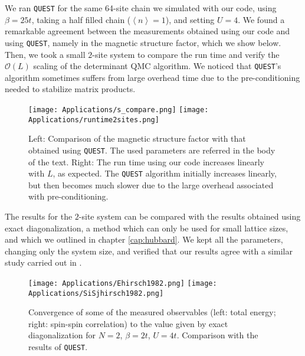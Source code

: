 We ran \texttt{QUEST} for the same 64-site chain we simulated with our code, using $\beta = 25 t$, taking a half filled chain ($\left\langle n \right\rangle = 1$), and setting $U = 4$.
We found a remarkable agreement between the measurements obtained using our code and using \texttt{QUEST}, namely in the magnetic structure factor, which we show below.
Then, we took a small $2$-site system to compare the run time and verify the $\mathcal{O}(L)$ scaling of the determinant \ac{QMC} algorithm.
We noticed that \texttt{QUEST}'s algorithm sometimes suffers from large overhead time due to the pre-conditioning needed to stabilize matrix products.

\begin{figure}[H]\label{fig:quest_time}
\texttt{[image: Applications/s\_compare.png]}
\hspace{-0.5cm}
\texttt{[image: Applications/runtime2sites.png]}
\caption[Comparison of the magnetic structure factor with that obtained using \texttt{QUEST}. Run time comparison.]{Left: Comparison of the magnetic structure factor with that obtained using \texttt{QUEST}.
The used parameters are referred in the body of the text.
Right: The run time using our code increases linearly with $L$, as expected.
The \texttt{QUEST} algorithm initially increases linearly, but then becomes much slower due to the large overhead associated with pre-conditioning.}
\end{figure}

The results for the $2$-site system can be compared with the results obtained using exact diagonalization, a method which can only be used for small lattice sizes, and which we outlined in chapter \ref{cap:hubbard}.
We kept all the parameters, changing only the system size, and verified that our results agree with a similar study carried out in \cite{hirsch_discrete_1983}.
\begin{figure}[H]\label{fig:hirsch1982}
\texttt{[image: Applications/Ehirsch1982.png]}
\hspace{-0.5cm}
\texttt{[image: Applications/SiSjhirsch1982.png]}
\caption[Convergence of some of the measured observables to the value given by exact diagonalization for $N=2$, $\beta = 2 t$, $U = 4 t$.
Comparison with the results of \texttt{QUEST}.]{Convergence of some of the measured observables (left: total energy; right: spin-spin correlation) to the value given by exact diagonalization for $N=2$, $\beta = 2 t$, $U = 4 t$.
Comparison with the results of \texttt{QUEST}.}
\end{figure}
